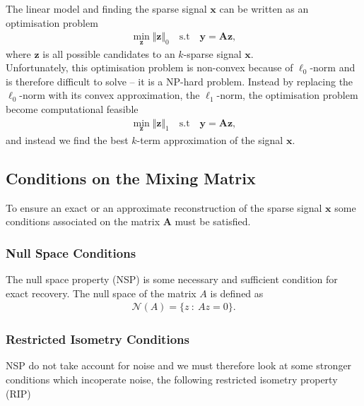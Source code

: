 \\ \\
The linear model and finding the sparse signal $\mathbf{x}$ can be written as an optimisation problem
\begin{align*}
\min_{\mathbf{z}} \Vert \mathbf{z} \Vert_0 \quad \text{s.t} \quad \mathbf{y} = \mathbf{Az},
\end{align*}
where $\mathbf{z}$ is all possible candidates to an $k$-sparse signal $\mathbf{x}$.
\\
Unfortunately, this optimisation problem is non-convex because of $\ell_0$-norm and is therefore difficult to solve -- it is a NP-hard problem. Instead by replacing the $\ell_0$-norm with its convex approximation, the $\ell_1$-norm, the optimisation problem become computational feasible \cite[p. 27]{CS}
\begin{align}\label{eq:p1}
\min_{\mathbf{z}} \Vert \mathbf{z} \Vert_1 \quad \text{s.t} \quad \mathbf{y} = \mathbf{Az},
\end{align} 
and instead we find the best $k$-term approximation of the signal $\mathbf{x}$.

\subsection{Conditions on the Mixing Matrix}
To ensure an exact or an approximate reconstruction of the sparse signal $\mathbf{x}$ some conditions associated on the matrix $\mathbf{A}$ must be satisfied.

\subsubsection{Null Space Conditions}
The null space property (NSP) is some necessary and sufficient condition for exact recovery.
The null space of the matrix $A$ is defined as
\begin{align*}
\mathcal{N}(A) = \{ z \ : \ Az = 0 \}.
\end{align*} 





\subsubsection{Restricted Isometry Conditions}
NSP do not take account for noise and we must therefore look at some stronger conditions which incoperate noise, the following restricted isometry property (RIP) %

